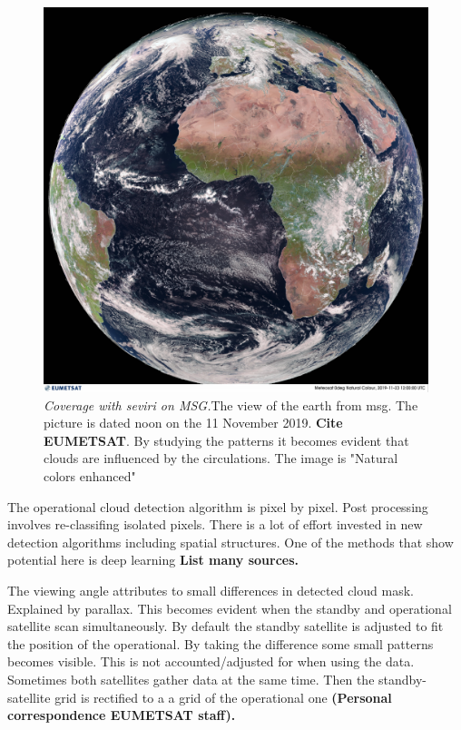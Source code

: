 \begin{figure}[h]
    \centering
    \includegraphics[scale=0.11]{Chapter2_Theory/images/MET10_RGBNatColourEnhncd_FullResolution_20191123120000.jpg}    
    \caption{\textit{Coverage with \acrshort{seviri} on MSG.}The view of the earth from \acrshort{msg}. The picture is dated noon on the 11 November 2019. \textbf{Cite EUMETSAT}. By studying the patterns it becomes evident that clouds are influenced by the circulations. The image is "Natural colors enhanced"}
    \label{fig:sat_view}
\end{figure}
The operational cloud detection algorithm is pixel by pixel. Post processing involves re-classifing isolated pixels. There is a lot of effort invested in new detection algorithms including spatial structures. One of the methods that show potential here is deep learning \textbf{List many sources.}

The viewing angle attributes to small differences in detected cloud mask. Explained by parallax. This becomes evident when the standby and operational satellite scan simultaneously. By default the standby satellite is adjusted to fit the position of the operational. By taking the difference some small patterns becomes visible. This is not accounted/adjusted for when using the data. Sometimes both satellites gather data at the same time. Then the standby-satellite grid is rectified to a a grid of the operational one \textbf{(Personal correspondence EUMETSAT staff).} 

